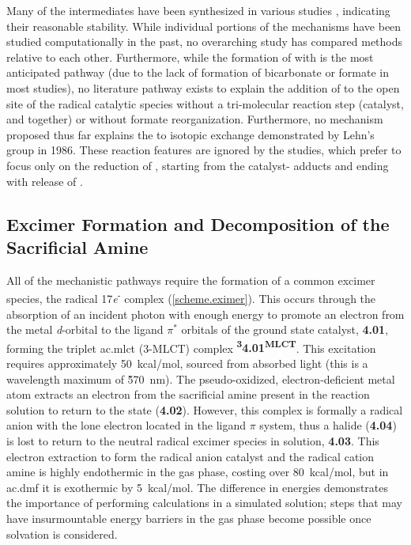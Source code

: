 Many of the intermediates have been synthesized in various studies \autocite{shaver1992, gibson1998, gibson1999, gibson2003}, indicating their reasonable stability. While individual portions of the mechanisms have been studied computationally in the past\autocite{agarwal2011, agarwal2012a, agarwal2012b}, no overarching study has compared methods relative to each other. Furthermore, while the formation of  with  is the most anticipated pathway (due to the lack of formation of bicarbonate or formate in most studies), no literature pathway exists to explain the addition of  to the open site of the radical catalytic species without a tri-molecular reaction step (catalyst,  and  together) or without formate reorganization. Furthermore, no mechanism proposed thus far explains the  to  isotopic exchange demonstrated by Lehn's group in 1986\autocite{hawecker1986}. These reaction features are ignored by the studies, which prefer to focus only on the reduction of , starting from the catalyst- adducts and ending with release of .

\subsection{Excimer Formation and Decomposition of the Sacrificial Amine}\label{ss.initiation}

All of the mechanistic pathways require the formation of a common excimer species, the radical 17\textit{e}\textsuperscript{-} complex (\autoref{scheme.eximer}). This occurs through the absorption of an incident photon with enough energy to promote an electron from the metal \textit{d}-orbital to the ligand $\pi^\ast$ orbitals of the ground state catalyst, \textbf{4.01}, forming the triplet \acrlong{ac.mlct} (3-MLCT) complex \textbf{\textsuperscript{3}4.01\textsuperscript{MLCT}}. This excitation requires approximately 50~kcal/mol, sourced from absorbed light (this is a wavelength maximum of \~ 570~nm). The pseudo-oxidized, electron-deficient metal atom extracts an electron from the sacrificial amine present in the reaction solution to return to the  state (\textbf{4.02}). However, this complex is formally a radical anion with the lone electron located in the ligand $\pi$ system, thus a halide (\textbf{4.04}) is lost to return to the neutral radical excimer species in solution, \textbf{4.03}. This electron extraction to form the radical anion catalyst and the radical cation amine is highly endothermic in the gas phase, costing over 80~kcal/mol, but in \gls{ac.dmf} it is exothermic by 5~kcal/mol. The difference in energies demonstrates the importance of performing calculations in a simulated solution; steps that may have insurmountable energy barriers in the gas phase become possible once solvation is considered.

